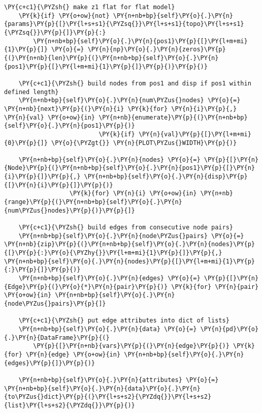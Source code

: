 \begin{tcolorbox}[breakable, size=fbox, boxrule=1pt, pad at break*=1mm,colback=cellbackground, colframe=cellborder]
\begin{Verbatim}[commandchars=\\\{\}]
    \PY{c+c1}{\PYZsh{} make z1 flat for flat model}
    \PY{k}{if} \PY{o+ow}{not} \PY{n+nb+bp}{self}\PY{o}{.}\PY{n}{params}\PY{p}{[}\PY{l+s+s1}{\PYZsq{}}\PY{l+s+s1}{topo}\PY{l+s+s1}{\PYZsq{}}\PY{p}{]}\PY{p}{:}
        \PY{n+nb+bp}{self}\PY{o}{.}\PY{n}{pos1}\PY{p}{[}\PY{l+m+mi}{1}\PY{p}{]} \PY{o}{=} \PY{n}{np}\PY{o}{.}\PY{n}{zeros}\PY{p}{(}\PY{n+nb}{len}\PY{p}{(}\PY{n+nb+bp}{self}\PY{o}{.}\PY{n}{pos1}\PY{p}{[}\PY{l+m+mi}{1}\PY{p}{]}\PY{p}{)}\PY{p}{)}

    \PY{c+c1}{\PYZsh{} build nodes from pos1 and disp if pos1 within defined length}
    \PY{n+nb+bp}{self}\PY{o}{.}\PY{n}{num\PYZus{}nodes} \PY{o}{=} \PY{n+nb}{next}\PY{p}{(}\PY{n}{i} \PY{k}{for} \PY{n}{i}\PY{p}{,} \PY{n}{val} \PY{o+ow}{in} \PY{n+nb}{enumerate}\PY{p}{(}\PY{n+nb+bp}{self}\PY{o}{.}\PY{n}{pos1}\PY{p}{)}
                          \PY{k}{if} \PY{n}{val}\PY{p}{[}\PY{l+m+mi}{0}\PY{p}{]} \PY{o}{\PYZgt{}} \PY{n}{PLOT\PYZus{}WIDTH}\PY{p}{)}

    \PY{n+nb+bp}{self}\PY{o}{.}\PY{n}{nodes} \PY{o}{=} \PY{p}{[}\PY{n}{Node}\PY{p}{(}\PY{n+nb+bp}{self}\PY{o}{.}\PY{n}{pos1}\PY{p}{[}\PY{n}{i}\PY{p}{]}\PY{p}{,} \PY{n+nb+bp}{self}\PY{o}{.}\PY{n}{disp}\PY{p}{[}\PY{n}{i}\PY{p}{]}\PY{p}{)}
                  \PY{k}{for} \PY{n}{i} \PY{o+ow}{in} \PY{n+nb}{range}\PY{p}{(}\PY{n+nb+bp}{self}\PY{o}{.}\PY{n}{num\PYZus{}nodes}\PY{p}{)}\PY{p}{]}

    \PY{c+c1}{\PYZsh{} build edges from consecutive node pairs}
    \PY{n+nb+bp}{self}\PY{o}{.}\PY{n}{node\PYZus{}pairs} \PY{o}{=} \PY{n+nb}{zip}\PY{p}{(}\PY{n+nb+bp}{self}\PY{o}{.}\PY{n}{nodes}\PY{p}{[}\PY{p}{:}\PY{o}{\PYZhy{}}\PY{l+m+mi}{1}\PY{p}{]}\PY{p}{,} \PY{n+nb+bp}{self}\PY{o}{.}\PY{n}{nodes}\PY{p}{[}\PY{l+m+mi}{1}\PY{p}{:}\PY{p}{]}\PY{p}{)}
    \PY{n+nb+bp}{self}\PY{o}{.}\PY{n}{edges} \PY{o}{=} \PY{p}{[}\PY{n}{Edge}\PY{p}{(}\PY{o}{*}\PY{n}{pair}\PY{p}{)} \PY{k}{for} \PY{n}{pair} \PY{o+ow}{in} \PY{n+nb+bp}{self}\PY{o}{.}\PY{n}{node\PYZus{}pairs}\PY{p}{]}

    \PY{c+c1}{\PYZsh{} put edge attributes into dict of lists}
    \PY{n+nb+bp}{self}\PY{o}{.}\PY{n}{data} \PY{o}{=} \PY{n}{pd}\PY{o}{.}\PY{n}{DataFrame}\PY{p}{(}
        \PY{p}{[}\PY{n+nb}{vars}\PY{p}{(}\PY{n}{edge}\PY{p}{)} \PY{k}{for} \PY{n}{edge} \PY{o+ow}{in} \PY{n+nb+bp}{self}\PY{o}{.}\PY{n}{edges}\PY{p}{]}\PY{p}{)}

    \PY{n+nb+bp}{self}\PY{o}{.}\PY{n}{attributes} \PY{o}{=} \PY{n+nb+bp}{self}\PY{o}{.}\PY{n}{data}\PY{o}{.}\PY{n}{to\PYZus{}dict}\PY{p}{(}\PY{l+s+s2}{\PYZdq{}}\PY{l+s+s2}{list}\PY{l+s+s2}{\PYZdq{}}\PY{p}{)}
\end{Verbatim}
\end{tcolorbox}

